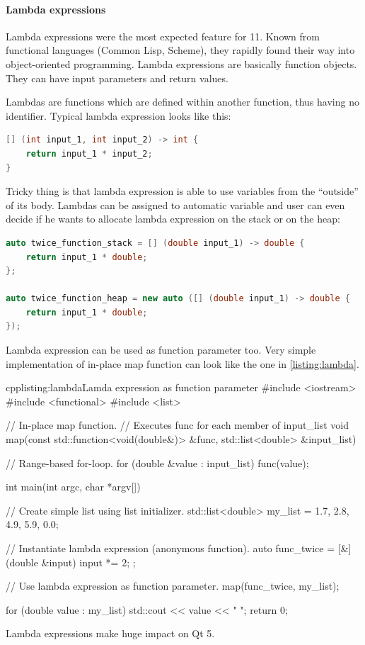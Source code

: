 \paragraph*{Lambda expressions}
Lambda expressions were the most expected feature for \cpp{} 11. Known from functional languages (\eg Common Lisp, Scheme), they rapidly found their way into object-oriented programming. Lambda expressions are basically function objects. They can have input parameters and return values.

Lambdas are functions which are defined within another function, thus having no identifier. Typical lambda expression looks like this:
\begin{lstlisting}[firstnumber=1,language=cpp]
[] (int input_1, int input_2) -> int {
	return input_1 * input_2;
}
\end{lstlisting}
Tricky thing is that lambda expression is able to use variables from the \enquote{outside} of its body. Lambdas can be assigned to automatic variable and user can even decide if he wants to allocate lambda expression on the stack or on the heap:
\begin{lstlisting}[firstnumber=1,language=cpp]
auto twice_function_stack = [] (double input_1) -> double {
	return input_1 * double;
};

auto twice_function_heap = new auto ([] (double input_1) -> double {
	return input_1 * double;
});
\end{lstlisting}
Lambda expression can be used as function parameter too. Very simple implementation of in-place map function can look like the one in \autoref{listing:lambda}.
\begin{fdoccode}{cpp}{listing:lambda}{Lamda expression as function parameter}
#include <iostream>
#include <functional>
#include <list>


// In-place map function.
// Executes func for each member of input_list
void map(const std::function<void(double&)> &func, std::list<double> &input_list) {

    // Range-based for-loop.
    for (double &value : input_list) {
		func(value);
    }
}

int main(int argc, char *argv[]) {
    // Create simple list using list initializer.
    std::list<double> my_list = {1.7, 2.8, 4.9, 5.9, 0.0};

    // Instantiate lambda expression (anonymous function).
    auto func_twice = [&] (double &input) {
		input *= 2;
    };

    // Use lambda expression as function parameter.
    map(func_twice, my_list);

    for (double value : my_list) {
		std::cout << value << " ";
    }
    return 0;
}
\end{fdoccode}
Lambda expressions make huge impact on Qt 5.

